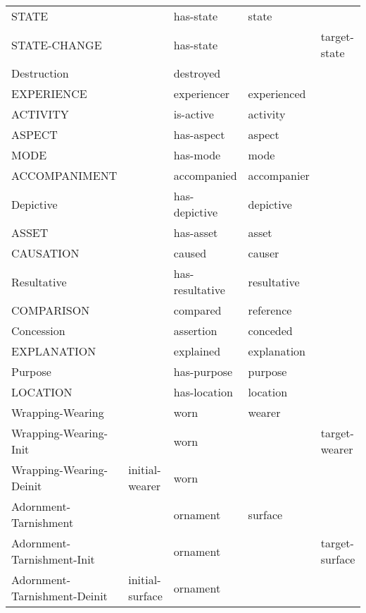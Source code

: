 \documentclass[a4paper]{article}
\newcommand{\fr}[1]{\textsf{#1}}
\newcommand{\rl}[1]{\textsf{#1}}
\begin{document}
\begin{table}
{\begin{tabular}{lllll}
            \fr{STATE} & & \rl{has-state} & \rl{state} & \\
            \fr{STATE-CHANGE} & & \rl{has-state} & & \rl{target-state} \\
            \fr{Destruction} & & \rl{destroyed} & & \\
            \fr{EXPERIENCE} & & \rl{experiencer} & \rl{experienced} & \\
            \fr{ACTIVITY} & & \rl{is-active} & \rl{activity} & \\
            \fr{ASPECT} & & \rl{has-aspect} & \rl{aspect} & \\
            \fr{MODE} & & \rl{has-mode} & \rl{mode} & \\
            \midrule
            \fr{ACCOMPANIMENT} & & \rl{accompanied} & \rl{accompanier} & \\
            \fr{Depictive} & & \rl{has-depictive} & \rl{depictive} & \\
            \fr{ASSET} & & \rl{has-asset} & \rl{asset} & \\
            \fr{CAUSATION} & & \rl{caused} & \rl{causer} & \\
            \fr{Resultative} & & \rl{has-resultative} & \rl{resultative} & \\
            \fr{COMPARISON} & & \rl{compared} & \rl{reference} & \\
            \fr{Concession} & & \rl{assertion} & \rl{conceded} & \\
            \fr{EXPLANATION} & & \rl{explained} & \rl{explanation} & \\
            \fr{Purpose} & & \rl{has-purpose} & \rl{purpose} & \\
            \fr{LOCATION} & & \rl{has-location} & \rl{location} & \\
            \fr{Wrapping-Wearing} & & \rl{worn} & \rl{wearer} & \\
            \fr{Wrapping-Wearing-Init} & & \rl{worn} & & \rl{target-wearer} \\
            \fr{Wrapping-Wearing-Deinit} & \rl{initial-wearer} & \rl{worn} & & \\
            \fr{Adornment-Tarnishment} & & \rl{ornament} & \rl{surface} & \\
            \fr{Adornment-Tarnishment-Init} & & \rl{ornament} & & \rl{target-surface} \\
            \fr{Adornment-Tarnishment-Deinit} & \rl{initial-surface} & \rl{ornament} & & \\

\end{tabular}}
\end{table}
\end{document}
